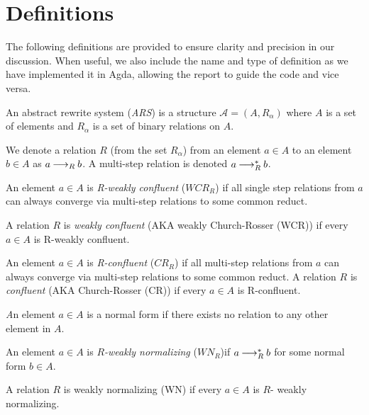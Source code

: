\section{Definitions}
\label{sec:Definitions}

The following definitions are provided to ensure clarity and precision 
in our discussion. When useful, we also include the name and type of
definition as we have implemented it in Agda, allowing the report to guide the code
and vice versa.

\begin{definition}
    An abstract rewrite system (\emph{ARS}) is a structure $\mathcal{A} = (A, R_\alpha)$ where
     $A$ is a set of elements and $R_\alpha$ is a set of binary relations on $A$.
\end{definition}

We denote a relation $R$ (from the set $R_\alpha$) from an element $a \in A$ to an element $b \in A$ as $a\mathbin{\longrightarrow_R} b$.
A multi-step relation is denoted $a \mathbin{\longrightarrow_R^*} b$.

\begin{definition}
    An element $a \in A$ is \emph{R-weakly confluent} ($WCR_R$) if all single step relations from $a$ can always converge
    via multi-step relations to some common reduct.
    
    A relation $R$ is \emph{weakly confluent} (AKA weakly Church-Rosser (WCR)) if every $a \in A$ is R-weakly confluent.
\end{definition}

\begin{definition}
    An element $a \in A$ is \emph{R-confluent} ($CR_R$) if all multi-step relations from $a$ can always converge
    via multi-step relations to some common reduct.
    A relation $R$ is \emph{confluent} (AKA Church-Rosser (CR)) if every $a \in A$ is R-confluent.
\end{definition}

\begin{definition}
    \emph An element $a \in A$ is a {normal form} if there exists no relation to any other element in $A$.
\end{definition}
  
\begin{definition}
    An element $a \in A$ is \emph{$R$-weakly normalizing} ($WN_{R}$)if $a \mathbin{\longrightarrow_R^*} b$ for some normal form $b \in A$.
  
    A relation $R$ is weakly normalizing (WN) if every $a \in A$ is $R$- weakly normalizing.
\end{definition}

